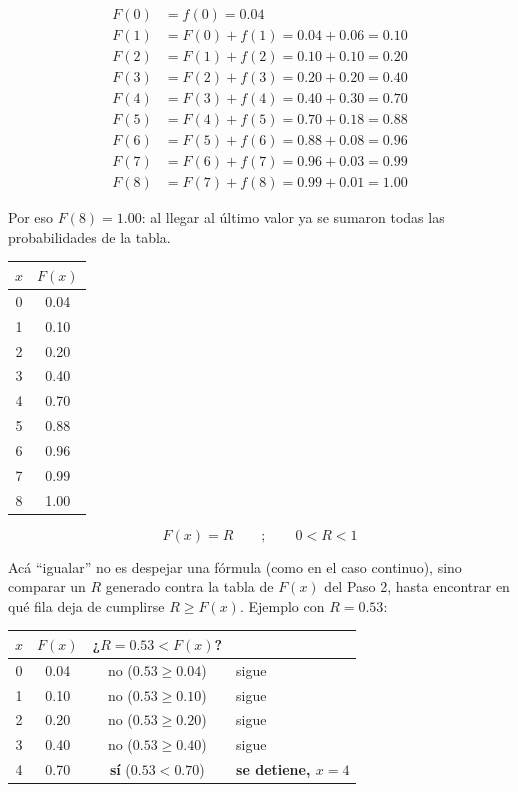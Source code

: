 \documentclass[12pt]{article}
\begin{document}
\begin{description}
    \begin{align*}
    F(0) &= f(0) = 0.04 \\
    F(1) &= F(0) + f(1) = 0.04 + 0.06 = 0.10 \\
    F(2) &= F(1) + f(2) = 0.10 + 0.10 = 0.20 \\
    F(3) &= F(2) + f(3) = 0.20 + 0.20 = 0.40 \\
    F(4) &= F(3) + f(4) = 0.40 + 0.30 = 0.70 \\
    F(5) &= F(4) + f(5) = 0.70 + 0.18 = 0.88 \\
    F(6) &= F(5) + f(6) = 0.88 + 0.08 = 0.96 \\
    F(7) &= F(6) + f(7) = 0.96 + 0.03 = 0.99 \\
    F(8) &= F(7) + f(8) = 0.99 + 0.01 = 1.00
    \end{align*}

    Por eso $F(8)=1.00$: al llegar al último valor ya se sumaron todas las probabilidades de la tabla.

    \begin{center}
    \begin{tabular}{cc}
    \toprule
    $x$ & $F(x)$ \\
    \midrule
    0 & 0.04 \\
    1 & 0.10 \\
    2 & 0.20 \\
    3 & 0.40 \\
    4 & 0.70 \\
    5 & 0.88 \\
    6 & 0.96 \\
    7 & 0.99 \\
    8 & 1.00 \\
    \bottomrule
    \end{tabular}
    \end{center}

    \item[Paso 3: Igualar la función acumulada $F(x) = R$]

    $$ F(x)=R \qquad ; \qquad 0 < R < 1 $$

    Acá ``igualar'' no es despejar una fórmula (como en el caso continuo), sino comparar un $R$ generado contra la tabla de $F(x)$ del Paso 2, hasta encontrar en qué fila deja de cumplirse $R \geq F(x)$. Ejemplo con $R=0.53$:

    \begin{center}
    \begin{tabular}{cccl}
    \toprule
    $x$ & $F(x)$ & ¿$R=0.53 < F(x)$? & \\
    \midrule
    0 & 0.04 & no ($0.53 \geq 0.04$) & sigue \\
    1 & 0.10 & no ($0.53 \geq 0.10$) & sigue \\
    2 & 0.20 & no ($0.53 \geq 0.20$) & sigue \\
    3 & 0.40 & no ($0.53 \geq 0.40$) & sigue \\
    4 & 0.70 & \textbf{sí} ($0.53 < 0.70$) & \textbf{se detiene, $x=4$} \\
    \bottomrule
    \end{tabular}
    \end{center}


\end{description}
\end{document}
